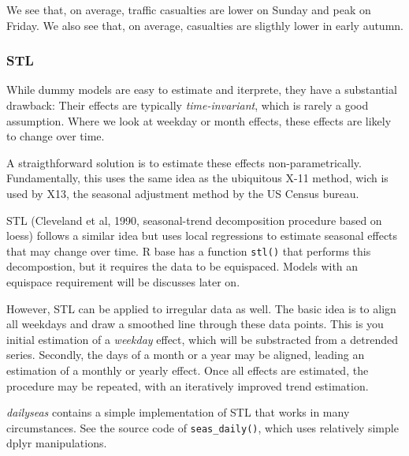 We see that, on average, traffic casualties are lower on Sunday and peak
on Friday. We also see that, on average, casualties are sligthly lower
in early autumn.

\hypertarget{stl}{%
\subsubsection{STL}\label{stl}}

While dummy models are easy to estimate and iterprete, they have a
substantial drawback: Their effects are typically \emph{time-invariant},
which is rarely a good assumption. Where we look at weekday or month
effects, these effects are likely to change over time.

A straigthforward solution is to estimate these effects
non-parametrically. Fundamentally, this uses the same idea as the
ubiquitous X-11 method, wich is used by X13, the seasonal adjustment
method by the US Census bureau.

STL (Cleveland et al, 1990, seasonal-trend decomposition procedure based
on loess) follows a similar idea but uses local regressions to estimate
seasonal effects that may change over time. R base has a function
\texttt{stl()} that performs this decompostion, but it requires the data
to be equispaced. Models with an equispace requirement will be discusses
later on.

However, STL can be applied to irregular data as well. The basic idea is
to align all weekdays and draw a smoothed line through these data
points. This is you initial estimation of a \emph{weekday} effect, which
will be substracted from a detrended series. Secondly, the days of a
month or a year may be aligned, leading an estimation of a monthly or
yearly effect. Once all effects are estimated, the procedure may be
repeated, with an iteratively improved trend estimation.

\emph{dailyseas} contains a simple implementation of STL that works in
many circumstances. See the source code of \texttt{seas\_daily()}, which
uses relatively simple dplyr manipulations.

